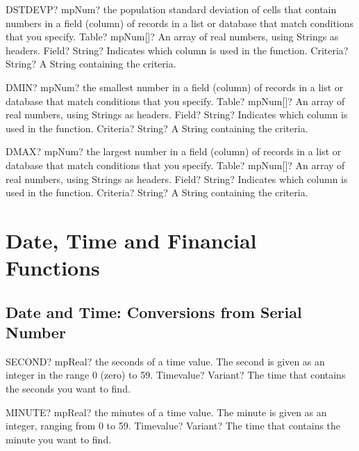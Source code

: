 \documentclass[12pt,a4paper,openany]{book}
\begin{document}
\begin{mpFunctionsExtract}
\mpWorksheetFunctionThreeNotImplemented
{DSTDEVP? mpNum? the population standard deviation of cells that contain numbers in a field (column) of records in a list or database that match conditions that you specify.}
{Table? mpNum[]? An array of real numbers, using Strings as headers.}
{Field? String? Indicates which column is used in the function.}
{Criteria? String? A String containing the criteria.}
\end{mpFunctionsExtract}

\begin{mpFunctionsExtract}
\mpWorksheetFunctionThreeNotImplemented
{DMIN? mpNum? the smallest number in a field (column) of records in a list or database that match conditions that you specify.}
{Table? mpNum[]? An array of real numbers, using Strings as headers.}
{Field? String? Indicates which column is used in the function.}
{Criteria? String? A String containing the criteria.}
\end{mpFunctionsExtract}

\begin{mpFunctionsExtract}
\mpWorksheetFunctionThreeNotImplemented
{DMAX? mpNum? the largest number in a field (column) of records in a list or database that match conditions that you specify.}
{Table? mpNum[]? An array of real numbers, using Strings as headers.}
{Field? String? Indicates which column is used in the function.}
{Criteria? String? A String containing the criteria.}
\end{mpFunctionsExtract}

\chapter{Date, Time and Financial Functions}

\section{Date and Time: Conversions from Serial Number}

\begin{mpFunctionsExtract}
\mpWorksheetFunctionOneNotImplemented
{SECOND? mpReal? the seconds of a time value. The second is given as an integer in the range 0 (zero) to 59.}
{Timevalue? Variant? The time that contains the seconds you want to find.}
\end{mpFunctionsExtract}

\begin{mpFunctionsExtract}
\mpWorksheetFunctionOneNotImplemented
{MINUTE? mpReal? the minutes of a time value. The minute is given as an integer, ranging from 0 to 59.}
{Timevalue? Variant? The time that contains the minute you want to find.}
\end{mpFunctionsExtract}
\end{document}
